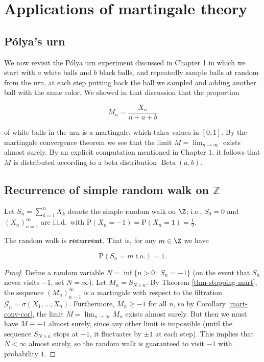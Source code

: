 

\chapter{Applications of martingale theory}

\section{Pólya's urn}
We now revisit the P\'olya urn experiment discussed
in Chapter 1 in which we start with $a$ white balls
and $b$ black balls, and repeatedly sample balls at
random from the urn, at each step putting back the
ball we sampled and adding another ball with the same
color. We showed in that discussion that the
proportion

\[
M_n = \frac{X_n}{n+a+b}
\]

\noindent of white balls in the urn is a martingale, which
takes values in $[0,1]$. By the martingale
convergence theorem we see that the limit
$M = \lim_{n\to\infty}$ exists almost surely. By an
explicit computation mentioned in Chapter 1, it
follows that $M$ is distributed according to a beta
distribution $\operatorname{Beta}(a,b)$.

\section{Recurrence of simple random walk on $\mathbb{Z}$}
Let $S_n = \sum_{k=1}^n X_k$ denote the simple random
walk on $\Z$; i.e., $S_0=0$ and $(X_n)_{n=1}^\infty$
are i.i.d.\ with
$\mathrm{P}(X_n=-1)=\mathrm{P}(X_n=1)=\tfrac12$.

\begin{thm}
The random walk is $\textbf{recurrent}$. That is, for
any $m\in\Z$ we have

\[
\mathrm{P}(S_n = m \textrm{ i.o.}) = 1.
\]

\end{thm}

\begin{proof}
Define a random variable
$N = \inf \{ n>0\,:\, S_n = -1 \}$ (on the event that
$S_n$ never visits $-1$, set $N=\infty$). Let
$M_n = S_{N\wedge n}$. By Theorem
\ref{thm-stopping-mart}, the sequence $(M_n)_{n=1}^\infty$
is a martingale with respect to the filtration
$\mathcal{G}_n = \sigma(X_1,\ldots,X_n)$.
Furthermore, $M_n \ge -1$ for all $n$, so by
Corollary \ref{mart-conv-cor}, the limit
$M=\lim_{n\to\infty} M_n$ exists almost surely. But
then we must have $M\equiv -1$ almost surely, since
any other limit is impossible (until the sequence
$S_{N\wedge n}$ stops at $-1$, it fluctuates by
$\pm 1$ at each step). This implies that $N<\infty$
almost surely, so the random walk is guaranteed to
visit $-1$ with probability $1$.
\end{proof}

